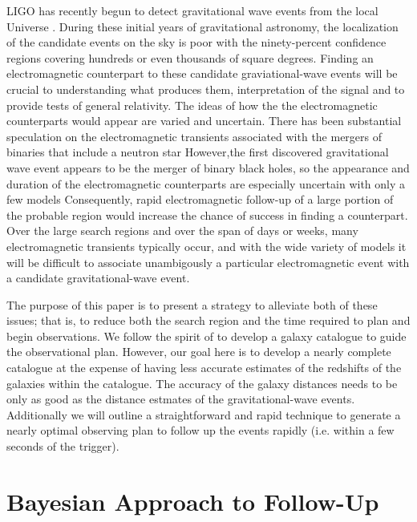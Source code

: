 \documentclass[useAMS,usenatbib]{mn2e}
\begin{document}
LIGO has recently begun to detect gravitational wave events from the
local Universe \citep{PhysRevLett.116.061102}.  During these initial
years of gravitational astronomy, the localization of the candidate
events on the sky is poor with the ninety-percent confidence regions
covering hundreds or even thousands of square degrees.  Finding an
electromagnetic counterpart to these candidate graviational-wave
events will be crucial to understanding what produces them,
interpretation of the signal and to provide tests of general
relativity.  The ideas of how the the electromagnetic counterparts
would appear are varied and uncertain. There has been substantial
speculation on the electromagnetic transients associated with the
mergers of binaries that include a neutron star
\citep[e.g.][]{2016PhRvD..93b4011E,2016arXiv160107711K,2016arXiv160100017D,2015arXiv151205435F,2015ApJ...814L..20M,2015PhRvD..92d4028K,2015arXiv150807939S,2015arXiv150807911S}
However,the first discovered gravitational wave event appears to be
the merger of binary black holes, so the appearance and duration of
the electromagnetic counterparts are especially uncertain with only a few models
\citep[e.g.][]{2015PhRvL.115n1102G,2015MNRAS.452.3419M,2016MNRAS.457..939C,2016ApJ...817..183Y}
Consequently, rapid electromagnetic follow-up of a large portion of
the probable region would increase the chance of success in finding a
counterpart.  Over the large search regions and over the span of days
or weeks, many electromagnetic transients typically occur, and with
the wide variety of models it will be difficult to associate
unambigously a particular electromagnetic event with a candidate
gravitational-wave event.

The purpose of this paper is to present a strategy to alleviate both
of these issues; that is, to reduce both the search region and the
time required to plan and begin observations.  We follow the spirit of
\citet{2015arXiv150803608G} to develop a galaxy catalogue to guide the
observational plan.  However, our goal here is to develop a nearly
complete catalogue at the expense of having less accurate estimates of
the redshifts of the galaxies within the catalogue.  The accuracy of
the galaxy distances needs to be only as good as the distance estmates
of the gravitational-wave events.  Additionally we will outline a
straightforward and rapid technique to generate a nearly optimal
observing plan to follow up the events rapidly (i.e. within a few
seconds of the trigger). 

\section{Bayesian Approach to Follow-Up}
\end{document}

